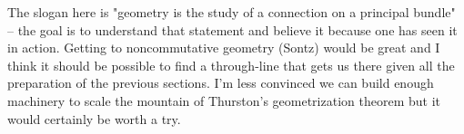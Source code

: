 \documentclass[article]{article}
\begin{document}
The slogan here is "geometry is the study of a connection on a principal bundle" -- the goal is to understand that statement and believe it because one has seen it in action. Getting to noncommutative geometry (Sontz) would be great and I think it should be possible to find a through-line that gets us there given all the preparation of the previous sections. I'm less convinced we can build enough machinery to scale the mountain of Thurston's geometrization theorem but it would certainly be worth a try.
\end{document}
